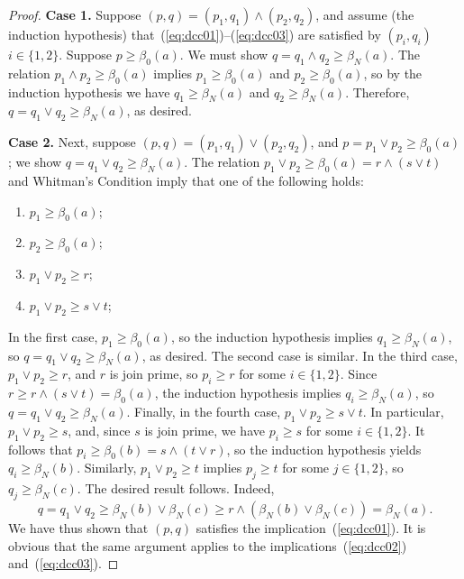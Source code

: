 \begin{proof}
  
    
    \medskip
    \noindent \textbf{Case 1.}
    Suppose $(p,q) = (p_1, q_1) \wedge (p_2, q_2)$, and assume (the induction hypothesis) 
    that~(\ref{eq:dcc01})--(\ref{eq:dcc03}) are satisfied 
    by $(p_i,q_i)$ $i\in \{1,2\}$.
    Suppose $p \geq \beta_0(a)$. We must show $q=q_1\wedge q_2 \geq \beta_N(a)$.
    The relation $p_1\wedge p_2 \geq \beta_0(a)$ implies 
    $p_1\geq \beta_0(a)$ and $p_2\geq \beta_0(a)$, 
    so by the induction hypothesis we have 
    $q_1\geq \beta_N(a)$ and $q_2\geq \beta_N(a)$.  
    Therefore, $q = q_1 \vee q_2 \geq \beta_N(a)$, as desired.
    

    \medskip
    \noindent \textbf{Case 2.}
    Next, 
    suppose $(p,q) = (p_1, q_1) \vee (p_2, q_2)$, and
    $p = p_1\vee p_2 \geq \beta_0(a)$; we show 
    $q = q_1 \vee q_2 \geq \beta_N(a)$. 
    The relation $p_1\vee p_2 \geq \beta_0(a) = r \wedge (s \vee t)$ and
    Whitman's Condition imply that one of the following holds:
    \begin{enumerate}
      \item   $p_1\geq \beta_0(a)$;  
      \item   $p_2\geq \beta_0(a)$;  
      \item   $p_1\vee p_2 \geq r$;  
      \item   $p_1\vee p_2 \geq s \vee t$;  
    \end{enumerate}
    In the first case, $p_1 \geq \beta_0(a)$, so
    the induction hypothesis implies $q_1\geq \beta_N(a)$, so 
    $q = q_1\vee q_2\geq \beta_N(a)$, as desired.  
    The second case is similar.
    In the third case, $p_1 \vee p_2 \geq r$, and $r$ is join prime, so 
    $p_i \geq r$ for some $i\in \{1,2\}$.  Since $r\geq r \wedge (s\vee t) = \beta_0(a)$, 
    the induction hypothesis implies $q_i \geq \beta_N(a)$, 
    so $q = q_1\vee q_2\geq \beta_N(a)$.
    Finally, in the fourth case, $p_1\vee p_2 \geq s \vee t$. 
    In particular, $p_1\vee p_2 \geq s$, and, since $s$ is join prime,
    we have $p_i\geq s$ for some $i\in \{1,2\}$.  
    It follows that $p_i \geq \beta_0(b) = s\wedge (t\vee r)$, so the induction hypothesis
    yields $q_i \geq \beta_N(b)$.
    Similarly, $p_1\vee p_2 \geq t$ implies 
    $p_j\geq t$ for some $j\in \{1,2\}$, so $q_j \geq \beta_N(c)$.
    The desired result follows.  Indeed,
    \[
    q = q_1\vee q_2 \geq \beta_N(b) \vee \beta_N(c) 
    \geq r \wedge (\beta_N(b)\vee \beta_N(c)) = \beta_N(a).
    \]                   
    We have thus shown that $(p,q)$ satisfies the implication~(\ref{eq:dcc01}).
    It is obvious that the same argument applies to the 
    implications~(\ref{eq:dcc02}) and~(\ref{eq:dcc03}).
  

\end{proof}
